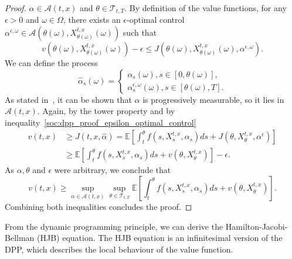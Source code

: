 \begin{proof}
    $\alpha \in \mathcal{A}(t,x)$ and $\theta \in \mathcal{T}_{t,T}$.
    By definition of the value functions, for any $\epsilon > 0$ and 
    $\omega \in \Omega$, there exists an $\epsilon$-optimal control
    $\alpha^{\epsilon, \omega} \in \mathcal{A}( \theta(\omega), X^{t,x}_{\theta(\omega)} (\omega)  )$
    such that
\begin{equation}\label{soc:dpp_proof_epsilon_optimal_control}
    v(\theta(\omega), X^{t,x}_{\theta(\omega)}(\omega)) - \epsilon \leq J(\theta(\omega), X^{t,x}_{\theta(\omega)}(\omega), \alpha^{\epsilon, \omega}).
\end{equation}    
    We can define the process
\begin{equation*}
    \hat\alpha_s(\omega) = 
    \begin{cases}
        \alpha_s(\omega), s \in [0,\theta(\omega)],\\
        \alpha_s^{\epsilon, \omega}(\omega), s \in [\theta(\omega), T].
    \end{cases}
\end{equation*}
As stated in~\cite{pham2009continuous}, it can be shown that $\hat \alpha$ is progressively measurable,
so it lies in $\mathcal{A}(t,x)$.
Again, by the tower property and by inequality~\eqref{soc:dpp_proof_epsilon_optimal_control}
\begin{align*}
    v(t,x) &\geq J(t,x, \hat \alpha) = \mathbb{E}\left[ \int_t^\theta f(s,X^{t,x}_s, \alpha_s) ds + J(\theta, X^{t,x}_\theta, \alpha^\epsilon) \right] \\
            &\geq \mathbb{E}\left[ \int_t^\theta f(s,X^{t,x}_s, \alpha_s) ds + v(\theta, X^{t,x}_\theta) \right] - \epsilon.
\end{align*}
As $\alpha, \theta$ and $\epsilon$ were arbitrary, we conclude that
\begin{equation}
    v(t,x) \geq \sup_{\alpha \in \mathcal{A}(t,x)} \sup_{\theta \in \mathcal{T}_{t,T}} \mathbb{E} \left[ \int_t^\theta f(s, X_s^{t,x}, \alpha_s) ds + v(\theta, X^{t,x}_\theta) \right].
\end{equation}
Combining both inequalities concludes the proof.
\end{proof}

From the dynamic programming principle, we can derive the Hamilton-Jacobi-Bellman (HJB)
equation. The HJB equation is an infinitesimal version of the DPP, which describes
the local behaviour of the value function.

